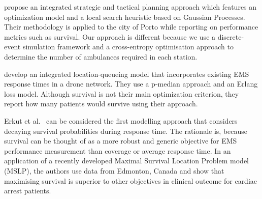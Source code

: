 \documentclass[preprint,12pt]{elsarticle}
\begin{document}
\FloatBarrier




\citet{amorim2019integrated} propose an integrated strategic and tactical planning approach which features an optimization model and a local search heuristic based on Gaussian Processes.  Their methodology is applied to the city of Porto while reporting on performance metrics such as survival. Our approach is different because we use a discrete-event simulation framework and a cross-entropy optimisation approach to determine the number of ambulances required in each station. 


\citet{boutilier2022drone} develop an integrated location-queueing model that incorporates existing EMS response times in a drone network. They use a p-median approach and an Erlang loss model. Although survival is not their main optimization criterion,  they report how many patients would survive using their approach.

Erkut et al.~\cite{Erkut200842} can be considered the first modelling approach that considers decaying survival probabilities during response time.  The rationale is, because survival can be thought of as a more robust and generic objective for EMS performance measurement than coverage or average response time. In an application of a recently developed Maximal Survival Location Problem model (MSLP), the authors use data from Edmonton, Canada and  show that maximising survival is superior to other objectives in clinical outcome for cardiac arrest patients.
\end{document}
